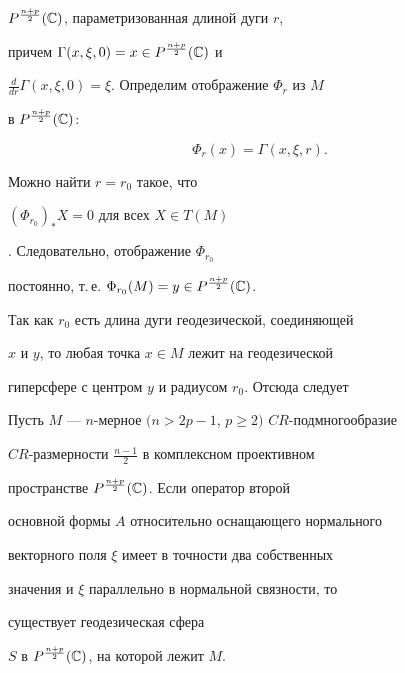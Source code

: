 $P^{\frac{n+p}{2}}(\Bbb C)$, параметризованная длиной дуги $r$,


причем $\Gamma(x,\xi,0)=x\in P^{\frac{n+p}{2}}(\Bbb C)$ и


$\frac{d}{dr}\Gamma(x,\xi,0)=\xi$. Определим отображение $\Phi_r$ из $M$


в $P^{\frac{n+p}{2}}(\Bbb C)$:


$$


\Phi_r(x)=\Gamma(x,\xi,r).


$$


Можно найти  $r=r_0$ такое, что


$(\Phi_{r_0})_*X=0$ для всех $X\in T(M)$


\cite{DjoricOkumura}. Следовательно, отображение $\Phi_{r_0}$


постоянно, т.\,е. $\Phi_{r_0}(M)=y\in P^{\frac{n+p}{2}}(\Bbb C)$.


Так как $r_0$ есть длина дуги геодезической, соединяющей


$x$ и $y$, то любая точка $x\in M$ лежит на геодезической


гиперсфере с центром  $y$ и радиусом $r_0$. Отсюда следует





\begin{athm}


Пусть $M$ --- $n$-мерное $(n>2p-1$, $p\ge 2)$ $CR$-подмногообразие


$CR$-размерности $\frac{n-1}{2}$ в комплексном проективном


пространстве $P^{\frac{n+p}{2}}(\Bbb C)$. Если оператор второй


основной формы $A$ относительно оснащающего нормального


векторного поля $\xi$ имеет в точности два собственных


значения и $\xi$ параллельно в нормальной связности, то


существует геодезическая сфера


$S$ в $P^{\frac{n+p}{2}}(\Bbb C)$, на которой лежит $M$.


\end{athm}





